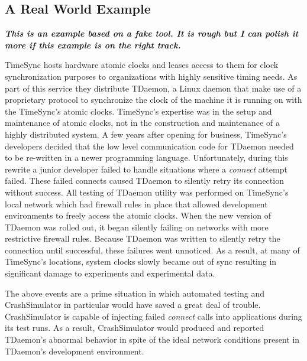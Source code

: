     \subsection{A Real World Example}

        \textbf{\emph{This is an example based on a fake tool. It is rough but I can polish it more if this example is
        on the right track.}}

        TimeSync hosts hardware atomic clocks and leases access to them for clock synchronization purposes to
        organizations with highly sensitive timing needs. As part of this service they distribute TDaemon, a Linux
        daemon that make use of a proprietary protocol to synchronize the clock of the machine it is running on with the
        TimeSync's atomic clocks. TimeSync's expertise was in the setup and maintenance of atomic clocks, not in the
        construction and maintenance of a highly distributed system. A few years after opening for business, TimeSync's
        developers decided that the low level communication code for TDaemon needed to be re-written in a newer
        programming language. Unfortunately, during this rewrite a junior developer failed to handle situations where a
        \emph{connect} attempt failed. These failed connects caused TDaemon to silently retry its connection without
        success. All testing of TDaemon utility was performed on TimeSync's local network which had firewall rules in
        place that allowed development environments to freely access the atomic clocks. When the new version of TDaemon
        was rolled out, it began silently failing on networks with more restrictive firewall rules. Because TDaemon was
        written to silently retry the connection until successful, these failures went unnoticed. As a result, at many
        of TimeSync's locations, system clocks slowly became out of sync resulting in significant damage to experiments
        and experimental data.

        The above events are a prime situation in which automated testing and CrashSimulator in particular would have
        saved a great deal of trouble. CrashSimulator is capable of injecting failed \emph{connect} calls into
        applications during its test runs. As a result, CrashSimulator would produced and reported TDaemon's abnormal
        behavior in spite of the ideal network conditions present in TDaemon's development environment.

